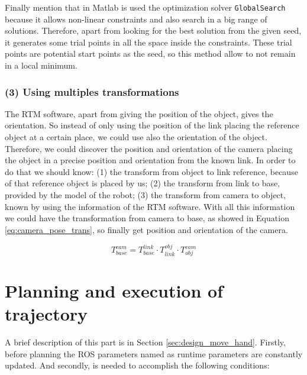 \documentclass[12pt,a4paper,final,twoside,openright]{report}
\begin{document}
Finally mention that in Matlab is used the optimization solver \texttt{GlobalSearch} because it allows non-linear constraints and also search in a big range of solutions. Therefore, apart from looking for the best solution from the given seed, it generates some trial points in all the space inside the constraints. These trial points are potential start points as the seed, so this method allow to not remain in a local minimum. 

\subsubsection{(3) Using multiples transformations}

The RTM software, apart from giving the position of the object, gives the orientation. So instead of only using the position of the link placing the reference object at a certain place, we could use also the orientation of the object. Therefore, we could discover the position and orientation of the camera placing the object in a precise position and orientation from the known link. In order to do that we should know: (1) the transform from object to link reference, because of that reference object is placed by us; (2) the transform from link to base, provided by the model of the robot; (3) the transform from camera to object, known by using the information of the RTM software. With all this information we could have the transformation from camera to base, as showed in Equation \eqref{eq:camera_pose_trans}, so finally get position and orientation of the camera.

\begin{equation}\label{eq:camera_pose_trans}
T_{base}^{cam} = T_{base}^{link} \cdot T_{link}^{obj} \cdot T_{obj}^{cam}
\end{equation} 

\section{Planning and execution of trajectory}

A brief description of this part is in Section \ref{sec:design_move_hand}. Firstly, before planning the ROS parameters named as runtime parameters are constantly updated. And secondly, is needed to accomplish the following conditions:
\end{document}
